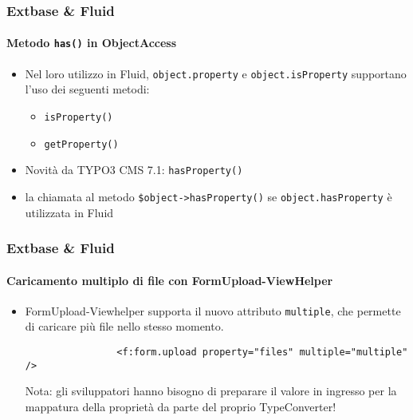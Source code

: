 \begin{frame}[fragile]
	\frametitle{Extbase \& Fluid}
	\framesubtitle{Metodo \texttt{has()} in ObjectAccess}

	\begin{itemize}

		\item Nel loro utilizzo in Fluid, \texttt{object.property} e \texttt{object.isProperty} 
			supportano l'uso dei seguenti metodi:

			\begin{itemize}
				\item \texttt{isProperty()}
				\item \texttt{getProperty()}
			\end{itemize}

		\item Novità da TYPO3 CMS 7.1: \texttt{hasProperty()}
		\item la chiamata al metodo \texttt{\$object->hasProperty()}\newline
			se \texttt{object.hasProperty} è utilizzata in Fluid

	\end{itemize}

\end{frame}


\begin{frame}[fragile]
	\frametitle{Extbase \& Fluid}
	\framesubtitle{Caricamento multiplo di file con FormUpload-ViewHelper}

	\begin{itemize}

		\item FormUpload-Viewhelper supporta il nuovo attributo \texttt{multiple}, che permette di
			caricare più file nello stesso momento.

			\begin{lstlisting}
				<f:form.upload property="files" multiple="multiple" />
			\end{lstlisting}

			\vspace{0.2cm}

			\begingroup
				\color{red}
					Nota: gli sviluppatori hanno bisogno di preparare il valore in ingresso per la mappatura della proprietà
					da parte del proprio TypeConverter!
			\endgroup

	\end{itemize}

\end{frame}

